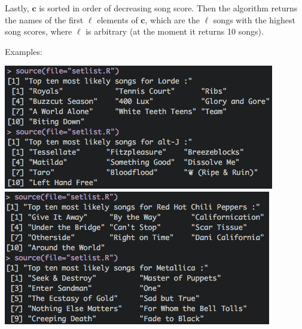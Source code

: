 \documentclass{article}
\begin{document}
Lastly, \(\boldsymbol{c}\) is sorted in order of decreasing song score. Then the algorithm returns the names of the first \(\ell\) elements of \(\boldsymbol{c}\), which are the \(\ell\) songs with the highest song scores, where \(\ell\) is arbitrary (at the moment it returns 10 songs). 


Examples:

\begin{center}
\includegraphics[scale=0.65]{lorde}
\includegraphics[scale=0.65]{metallica}
\end{center}
\end{document}
